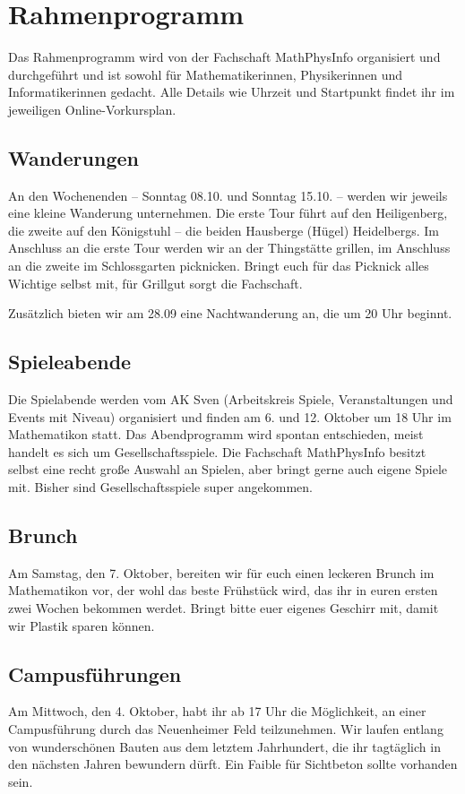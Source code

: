 \newpage
\section{Rahmenprogramm}
\label{vorkurs-rahmenprogramm}

Das Rahmenprogramm wird von der Fachschaft MathPhysInfo organisiert und durchgeführt und ist sowohl für Mathematikerinnen, Physikerinnen und Informatikerinnen gedacht. Alle Details wie Uhrzeit und Startpunkt findet ihr im jeweiligen Online-Vorkursplan.

\subsection{Wanderungen}
An den Wochenenden -- Sonntag 08.10. und Sonntag 15.10. -- werden wir jeweils eine kleine Wanderung unternehmen. Die erste Tour führt auf den Heiligenberg, die zweite auf den Königstuhl -- die beiden Hausberge (Hügel) Heidelbergs. Im Anschluss an die erste Tour werden wir an der Thingstätte grillen, im Anschluss an die zweite im Schlossgarten picknicken. Bringt euch für das Picknick alles Wichtige selbst mit, für Grillgut sorgt die Fachschaft.

Zusätzlich bieten wir am 28.09 eine Nachtwanderung an, die um 20 Uhr beginnt.

\subsection{Spieleabende}
Die Spielabende werden vom AK Sven (Arbeitskreis Spiele, Veranstaltungen und Events mit Niveau) organisiert und finden am 6. und 12. Oktober um 18 Uhr im \gls{Mathematikon} statt. Das Abendprogramm wird spontan entschieden, meist handelt es sich um Gesellschaftsspiele. Die Fachschaft MathPhysInfo besitzt selbst eine recht große Auswahl an Spielen, aber bringt gerne auch eigene Spiele mit. Bisher sind Gesellschaftsspiele super angekommen.

\subsection{Brunch}
Am Samstag, den 7. Oktober, bereiten wir für euch einen leckeren Brunch im \gls{Mathematikon} vor, der wohl das beste Frühstück wird, das ihr in euren ersten zwei Wochen bekommen werdet. Bringt bitte euer eigenes Geschirr mit, damit wir Plastik sparen können.

\subsection{Campusführungen}
Am Mittwoch, den 4. Oktober, habt ihr ab 17 Uhr die Möglichkeit, an einer Campusführung durch das Neuenheimer Feld teilzunehmen. Wir laufen entlang von wunderschönen Bauten aus dem letztem Jahrhundert, die ihr tagtäglich in den nächsten Jahren bewundern dürft. Ein Faible für Sichtbeton sollte vorhanden sein.

